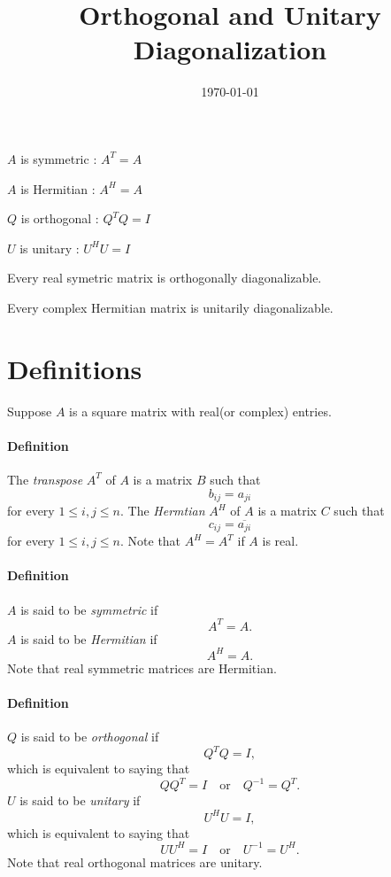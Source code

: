 \documentclass{article}
\title{Orthogonal and Unitary Diagonalization}
\author{}
\date{\today}
\begin{document}
\maketitle
\tableofcontents

\begin{center}
\bigskip\bigskip\bigskip
$A$ is symmetric : $A^T=A$
\par\bigskip
$A$ is Hermitian : $A^H=A$
\par\bigskip
$Q$ is orthogonal : $Q^TQ=I$
\par\bigskip
$U$ is unitary : $U^HU=I$
\par\bigskip\bigskip\bigskip
Every real symetric matrix is orthogonally diagonalizable.
\par\bigskip
Every complex Hermitian matrix is unitarily diagonalizable.
\end{center}
\newpage

%
\section{Definitions}
Suppose $A$ is a square matrix with real(or complex) entries.
\paragraph{Definition}
The \emph{transpose} $A^T$ of $A$ is a matrix $B$ such that
\[b_{ij}=a_{ji}\]
for every \(1\le i,j\le n\).
The \emph{Hermtian} $A^H$ of $A$ is a matrix $C$ such that
\[c_{ij}=\overline{a_{ji}}\]
for every \(1\le i,j\le n\).
Note that $A^H=A^T$ if $A$ is real.

\paragraph{Definition}
$A$ is said to be \emph{symmetric} if
\[A^T=A.\]
$A$ is said to be \emph{Hermitian} if
$$A^H=A.$$
Note that real symmetric matrices are Hermitian.

\paragraph{Definition}
$Q$ is said to be \emph{orthogonal} if
\[Q^TQ=I,\]
which is equivalent to saying that
\[QQ^T=I\quad\text{or}\quad Q^{-1}=Q^T.\]
$U$ is said to be \emph{unitary} if
\[U^HU=I,\]
which is equivalent to saying that
\[UU^H=I\quad\text{or}\quad U^{-1}=U^H.\]
Note that real orthogonal matrices are unitary.
\end{document}
